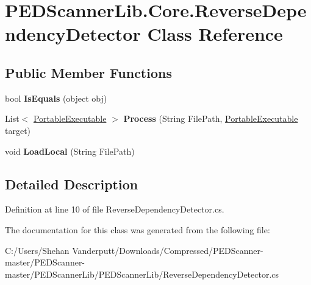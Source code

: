 \hypertarget{class_p_e_d_scanner_lib_1_1_core_1_1_reverse_dependency_detector}{}\section{P\+E\+D\+Scanner\+Lib.\+Core.\+Reverse\+Dependency\+Detector Class Reference}
\label{class_p_e_d_scanner_lib_1_1_core_1_1_reverse_dependency_detector}
\subsection*{Public Member Functions}
\begin{DoxyCompactItemize}
\item 
\mbox{\label{class_p_e_d_scanner_lib_1_1_core_1_1_reverse_dependency_detector_a7d2118a7f4c812a989368bfb042783d9}} 
bool {\bfseries Is\+Equals} (object obj)
\item 
\mbox{\label{class_p_e_d_scanner_lib_1_1_core_1_1_reverse_dependency_detector_a212e440834acd16e078fad6f31fdc484}} 
List$<$ \mbox{\hyperlink{class_p_e_d_scanner_lib_1_1_core_1_1_portable_executable}{Portable\+Executable}} $>$ {\bfseries Process} (String File\+Path, \mbox{\hyperlink{class_p_e_d_scanner_lib_1_1_core_1_1_portable_executable}{Portable\+Executable}} target)
\item 
\mbox{\label{class_p_e_d_scanner_lib_1_1_core_1_1_reverse_dependency_detector_a49439e6b37f21aabe4a47aab83853fbc}} 
void {\bfseries Load\+Local} (String File\+Path)
\end{DoxyCompactItemize}


\subsection{Detailed Description}


Definition at line 10 of file Reverse\+Dependency\+Detector.\+cs.



The documentation for this class was generated from the following file\+:\begin{DoxyCompactItemize}
\item 
C\+:/\+Users/\+Shehan Vanderputt/\+Downloads/\+Compressed/\+P\+E\+D\+Scanner-\/master/\+P\+E\+D\+Scanner-\/master/\+P\+E\+D\+Scanner\+Lib/\+P\+E\+D\+Scanner\+Lib/Reverse\+Dependency\+Detector.\+cs\end{DoxyCompactItemize}
